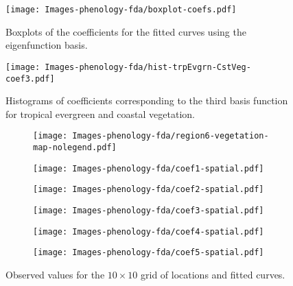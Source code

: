 \begin{figure}
	[htbp] 
	
	\centering 
	\texttt{[image: Images-phenology-fda/boxplot-coefs.pdf]} \caption{Boxplots of the coefficients for the fitted curves using the eigenfunction basis. } \label{fig:coef boxplot} 
\end{figure}
\begin{figure}
	[htbp] 
	
	\centering 
	\texttt{[image: Images-phenology-fda/hist-trpEvgrn-CstVeg-coef3.pdf]} \caption{Histograms of coefficients corresponding to the third basis function for tropical evergreen and coastal vegetation. } \label{fig:histogram coefs} 
\end{figure}

\begin{figure}
	\centering 
	\begin{subfigure}
		[b]{0.3 
		\textwidth} \centering 
		\texttt{[image: Images-phenology-fda/region6-vegetation-map-nolegend.pdf]} 
	\end{subfigure}
	\begin{subfigure}
		[b]{0.3 
		\textwidth} \centering 
		\texttt{[image: Images-phenology-fda/coef1-spatial.pdf]} 
	\end{subfigure}
	\begin{subfigure}
		[b]{0.3 
		\textwidth} \centering 
		\texttt{[image: Images-phenology-fda/coef2-spatial.pdf]} 
	\end{subfigure}
	\begin{subfigure}
		[b]{0.3 
		\textwidth} \centering 
		\texttt{[image: Images-phenology-fda/coef3-spatial.pdf]} 
	\end{subfigure}
	\begin{subfigure}
		[b]{0.3 
		\textwidth} \centering 
		\texttt{[image: Images-phenology-fda/coef4-spatial.pdf]} 
	\end{subfigure}
	\begin{subfigure}
		[b]{0.3 
		\textwidth} \centering 
		\texttt{[image: Images-phenology-fda/coef5-spatial.pdf]} 
	\end{subfigure}
	\caption{Observed values for the $10\times 10$ grid of locations and fitted curves.} \label{fig:estimated curves} 
\end{figure}

